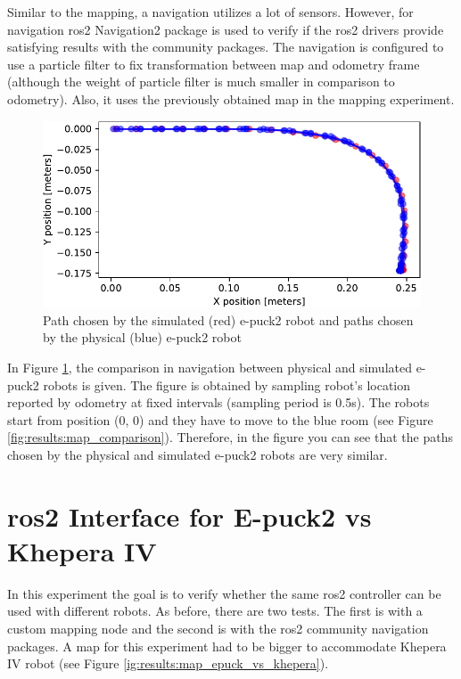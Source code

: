 Similar to the mapping, a navigation utilizes a lot of sensors.
However, for navigation \ac{ros2} Navigation2 package is used to verify if the \ac{ros2} drivers provide satisfying results with the community packages.
The navigation is configured to use a particle filter to fix transformation between map and odometry frame (although the weight of particle filter is much smaller in comparison to odometry).
Also, it uses the previously obtained map in the mapping experiment.

\begin{figure}[H]
    \centering
    \includegraphics[width=\textwidth]{./results/figures/navigation_comparison.pdf}
    \caption{Path chosen by the simulated (red) e-puck2 robot and paths chosen by the physical (blue) e-puck2 robot}
    \label{fig:results:navigation_comparison}
\end{figure}

In Figure \ref{fig:results:navigation_comparison}, the comparison in navigation between physical and simulated e-puck2 robots is given.
The figure is obtained by sampling robot's location reported by odometry at fixed intervals (sampling period is 0.5s).
The robots start from position (0, 0) and they have to move to the blue room (see Figure \ref{fig:results:map_comparison}).
Therefore, in the figure you can see that the paths chosen by the physical and simulated e-puck2 robots are very similar.  

\section{\ac{ros2} Interface for E-puck2 vs Khepera IV}

In this experiment the goal is to verify whether the same \ac{ros2} controller can be used with different robots.
As before, there are two tests.
The first is with a custom mapping node and the second is with the \ac{ros2} community navigation packages.
A map for this experiment had to be bigger to accommodate Khepera IV robot (see Figure \ref{ig:results:map_epuck_vs_khepera}).

